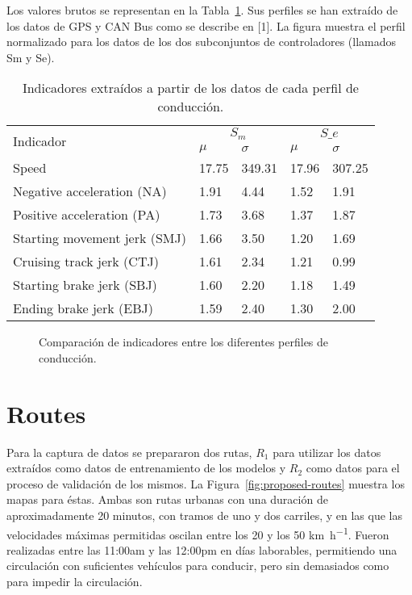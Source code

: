 Los valores brutos se representan en la Tabla~\ref{tbl:raw-indicators-from-drivers-profiles}. Sus perfiles se han extraído de los datos de GPS y CAN Bus como se describe en [1]. La figura muestra el perfil normalizado para los datos de los dos subconjuntos de controladores (llamados Sm y Se).

\begin{table}
	\caption[Indicadores de los datos extraídos de cada perfil]{Indicadores extraídos a partir de los datos de cada perfil de conducción.}
	\label{tbl:raw-indicators-from-drivers-profiles}
	\begin{tabular}{@{}lllll@{}}
		\toprule
		\multirow{2}{*}{Indicador} & \multicolumn{2}{c}{$S_m$} & \multicolumn{2}{c}{$S\_e$} \\
		& $\mu$ & $\sigma$ & $\mu$ & $\sigma$ \\ \midrule
		Speed & 17.75 & 349.31 & 17.96 & 307.25 \\
		Negative acceleration (NA) & 1.91 & 4.44 & 1.52 & 1.91 \\
		Positive acceleration (PA) & 1.73 & 3.68 & 1.37 & 1.87 \\
		Starting movement jerk (SMJ) & 1.66 & 3.50 & 1.20 & 1.69 \\
		Cruising track jerk (CTJ) & 1.61 & 2.34 & 1.21 & 0.99 \\
		Starting brake jerk (SBJ) & 1.60 & 2.20 & 1.18 & 1.49 \\
		Ending brake jerk (EBJ) & 1.59 & 2.40 & 1.30 & 2.00 \\
		\bottomrule
	\end{tabular}
\end{table}

\begin{figure}
	\centering
	\qquad
	\caption{Comparación de indicadores entre los diferentes perfiles de conducción.}
	\label{fig:raw-indicators-from-drivers-profiles}
\end{figure}

\section{Routes}

Para la captura de datos se prepararon dos rutas, $R_1$ para utilizar los datos extraídos como datos de entrenamiento de los modelos y $R_2$ como datos para el proceso de validación de los mismos. La Figura~\ref{fig:proposed-routes} muestra los mapas para éstas. Ambas son rutas urbanas con una duración de aproximadamente 20 minutos, con tramos de uno y dos carriles, y en las que las velocidades máximas permitidas oscilan entre los 20 y los 50 \si{\kilo\metre\per\hour}. Fueron realizadas entre las 11:00am y las 12:00pm en días laborables, permitiendo una circulación con suficientes vehículos para conducir, pero sin demasiados como para impedir la circulación.

